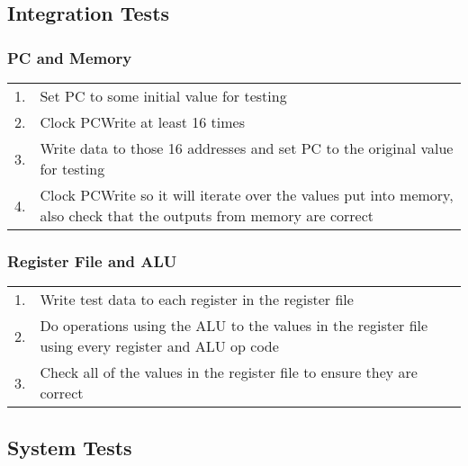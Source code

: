 	\subsection{Integration Tests}
		\subsubsection{PC and Memory}
			\begin{tabular}{ r  p{15cm} }
				1. & Set PC to some initial value for testing\\
				2. & Clock PCWrite at least 16 times\\
				3. & Write data to those 16 addresses and set PC to the original value for testing\\
				4. & Clock PCWrite so it will iterate over the values put into memory, also check that the outputs from memory are correct\\
			\end{tabular}
		\subsubsection{Register File and ALU}
			\begin{tabular}{ r  p{15cm} }
				1. & Write test data to each register in the register file\\
				2. & Do operations using the ALU to the values in the register file using every register and ALU op code\\
				3. & Check all of the values in the register file to ensure they are correct\\
			\end{tabular}
	\subsection{System Tests}
